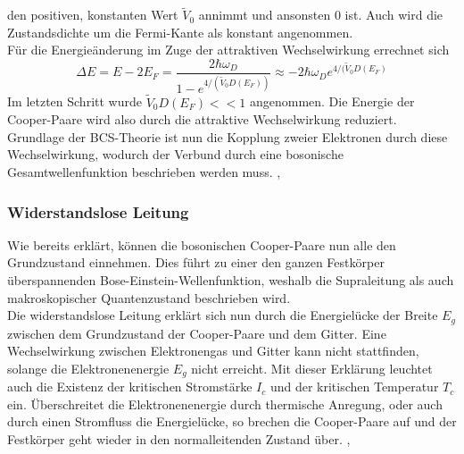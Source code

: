 den positiven, konstanten Wert $\tilde{V}_0$ annimmt und ansonsten 0 ist. 
Auch wird die Zustandsdichte um die Fermi-Kante als konstant angenommen.\\
Für die Energieänderung im Zuge der attraktiven Wechselwirkung errechnet sich 
\[
	\Delta E = E - 2 E_F = \frac{2\hbar \omega_D}{1- e^{4/(\tilde{V}_0 D(E_F))}}
			 \approx - 2 \hbar \omega_D e^{4/(\tilde{V}_0 D(E_F)}
\]
Im letzten Schritt wurde $\tilde{V}_0 D(E_F) << 1$ angenommen. Die Energie der
Cooper-Paare wird also durch die attraktive Wechselwirkung reduziert.
\\
Grundlage der BCS-Theorie ist nun die Kopplung zweier Elektronen durch diese 
Wechselwirkung, wodurch der Verbund durch eine bosonische Gesamtwellenfunktion
beschrieben werden muss. \cite{bcswiki}, \cite{hunklinger}

		\subsubsection{Widerstandslose Leitung}
Wie bereits erklärt, können die bosonischen Cooper-Paare nun alle den Grundzustand
einnehmen. Dies führt zu einer den ganzen Festkörper überspannenden 
Bose-Einstein-Wellenfunktion, weshalb die Supraleitung als auch makroskopischer
Quantenzustand beschrieben wird. \\
Die widerstandslose Leitung erklärt sich nun durch die Energielücke der Breite 
$E_g$ zwischen dem Grundzustand der Cooper-Paare und dem Gitter. Eine Wechselwirkung
zwischen Elektronengas und Gitter kann nicht stattfinden, solange die 
Elektronenenergie $E_g$ nicht erreicht. Mit dieser Erklärung leuchtet auch die 
Existenz der kritischen Stromstärke $I_c$ und der kritischen Temperatur $T_c$ ein.
Überschreitet die Elektronenenergie durch thermische Anregung, oder auch durch
einen Stromfluss die Energielücke, so brechen die Cooper-Paare auf und der 
Festkörper geht wieder in den normalleitenden Zustand über. \cite{hunklinger}, 
\cite{suprawiki}

